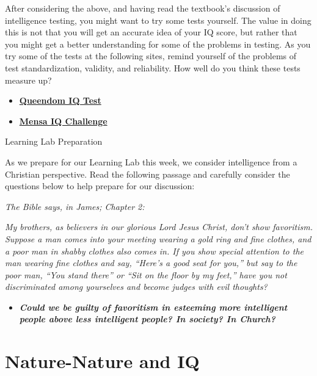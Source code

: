 \documentclass[
]{book}
\providecommand{\tightlist}{%
  \setlength{\itemsep}{0pt}\setlength{\parskip}{0pt}}
\begin{document}
\begin{reflect}
After considering the above, and having read the textbook's discussion of intelligence testing, you might want to try some tests yourself. The value in doing this is not that you will get an accurate idea of your IQ score, but rather that you might get a better understanding for some of the problems in testing. As you try some of the tests at the following sites, remind yourself of the problems of test standardization, validity, and reliability. How well do you think these tests measure up?

\begin{itemize}
\tightlist
\item
  \href{https://www.queendom.com/tests/index.htm}{\textbf{Queendom IQ Test}}\\
\item
  \href{https://www.mensa.org/public/mensa-iq-challenge}{\textbf{Mensa IQ Challenge}}
\end{itemize}

{Learning Lab Preparation}

As we prepare for our Learning Lab this week, we consider intelligence from a Christian perspective. Read the following passage and carefully consider the questions below to help prepare for our discussion:

\emph{The Bible says, in James; Chapter 2:}

\emph{My brothers, as believers in our glorious Lord Jesus Christ, don't show favoritism. Suppose a man comes into your meeting wearing a gold ring and fine clothes, and a poor man in shabby clothes also comes in. If you show special attention to the man wearing fine clothes and say, ``Here's a good seat for you,'' but say to the poor man, ``You stand there'' or ``Sit on the floor by my feet,'' have you not discriminated among yourselves and become judges with evil thoughts?}

\begin{itemize}
\tightlist
\item
  \textbf{\emph{Could we be guilty of favoritism in esteeming more intelligent people above less intelligent people? In society? In Church?}}
\end{itemize}
\end{reflect}

\hypertarget{nature-nature-and-iq}{%
\section{Nature-Nature and IQ}\label{nature-nature-and-iq}}
\end{document}
